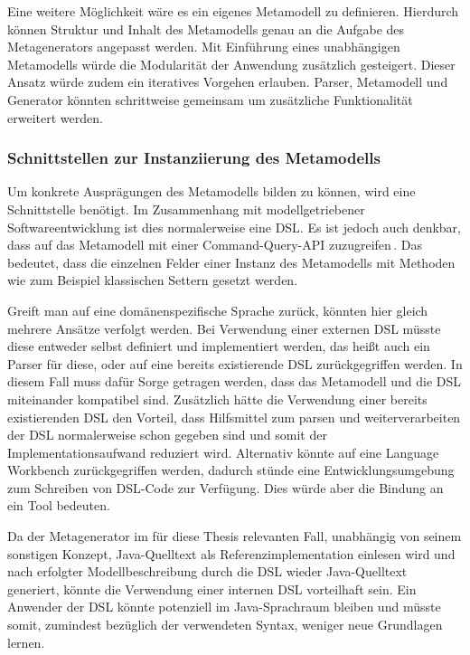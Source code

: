 \documentclass[12pt,oneside,a4paper,parskip]{scrbook}
\begin{document}
Eine weitere Möglichkeit wäre es ein eigenes Metamodell zu definieren. Hierdurch können Struktur und Inhalt des Metamodells genau an die Aufgabe des Metagenerators angepasst werden. Mit Einführung eines unabhängigen Metamodells würde die Modularität der Anwendung zusätzlich gesteigert. Dieser Ansatz würde zudem ein iteratives Vorgehen erlauben. Parser, Metamodell und Generator könnten schrittweise gemeinsam um zusätzliche Funktionalität erweitert werden.

\subsubsection{Schnittstellen zur Instanziierung des Metamodells}

Um konkrete Ausprägungen des Metamodells bilden zu können, wird eine Schnittstelle benötigt. Im Zusammenhang mit modellgetriebener Softwareentwicklung ist dies normalerweise eine DSL. Es ist jedoch auch denkbar, dass auf das Metamodell mit einer Command-Query-API zuzugreifen\,\cite[S. 343ff.]{fowler2010}. Das bedeutet, dass die einzelnen Felder einer Instanz des Metamodells mit Methoden wie zum Beispiel klassischen Settern gesetzt werden.

Greift man auf eine domänenspezifische Sprache zurück, könnten hier gleich mehrere Ansätze verfolgt werden. Bei Verwendung einer externen DSL müsste diese entweder selbst definiert und implementiert werden, das heißt auch ein Parser für diese, oder auf eine bereits existierende DSL zurückgegriffen werden. In diesem Fall muss dafür Sorge getragen werden, dass das Metamodell und die DSL miteinander kompatibel sind. Zusätzlich hätte die Verwendung einer bereits existierenden DSL den Vorteil, dass Hilfsmittel zum parsen und weiterverarbeiten der DSL normalerweise schon gegeben sind und somit der Implementationsaufwand reduziert wird. Alternativ könnte auf eine Language Workbench zurückgegriffen werden, dadurch stünde eine Entwicklungsumgebung zum Schreiben von DSL-Code zur Verfügung. Dies würde aber die Bindung an ein Tool bedeuten.

Da der Metagenerator im für diese Thesis relevanten Fall, unabhängig von seinem sonstigen Konzept, Java-Quelltext als Referenzimplementation einlesen wird und nach erfolgter Modellbeschreibung durch die DSL wieder Java-Quelltext generiert, könnte die Verwendung einer internen DSL vorteilhaft sein. Ein Anwender der DSL könnte potenziell im Java-Sprachraum bleiben und müsste somit, zumindest bezüglich der verwendeten Syntax, weniger neue Grundlagen lernen.
\end{document}

